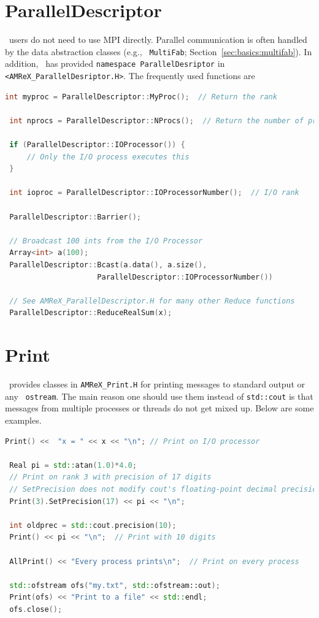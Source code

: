\section{ParallelDescriptor}

\amrex\ users do not need to use MPI directly.  Parallel communication
is often handled by the data abstraction classes (e.g., {\tt
  MultiFab}; Section~\ref{sec:basics:multifab}).  In addition, \amrex\
has provided {\tt namespace ParallelDesriptor} in {\tt
  <AMReX\_ParallelDesriptor.H>}.  The frequently used functions are
\begin{lstlisting}[language=cpp]
 int myproc = ParallelDescriptor::MyProc();  // Return the rank
 
 int nprocs = ParallelDescriptor::NProcs();  // Return the number of processes
 
 if (ParallelDescriptor::IOProcessor()) { 
     // Only the I/O process executes this
 }
 
 int ioproc = ParallelDescriptor::IOProcessorNumber();  // I/O rank
 
 ParallelDescriptor::Barrier();
 
 // Broadcast 100 ints from the I/O Processor
 Array<int> a(100);
 ParallelDescriptor::Bcast(a.data(), a.size(),
                     ParallelDescriptor::IOProcessorNumber())
 
 // See AMReX_ParallelDescriptor.H for many other Reduce functions 
 ParallelDescriptor::ReduceRealSum(x);
\end{lstlisting}

\section{Print}
\label{sec:basics:print}

\amrex\ provides classes in {\tt AMReX\_Print.H} for printing messages
to standard output or any \cpp\ {\tt ostream}.  The main reason one
should use them instead of {\tt std::cout} is that messages from
multiple processes or threads do not get mixed up.  Below are some
examples.
\begin{lstlisting}[language=cpp]
 Print() <<  "x = " << x << "\n"; // Print on I/O processor
 
 Real pi = std::atan(1.0)*4.0;
 // Print on rank 3 with precision of 17 digits
 // SetPrecision does not modify cout's floating-point decimal precision setting.
 Print(3).SetPrecision(17) << pi << "\n";

 int oldprec = std::cout.precision(10);
 Print() << pi << "\n";  // Print with 10 digits
 
 AllPrint() << "Every process prints\n";  // Print on every process
 
 std::ofstream ofs("my.txt", std::ofstream::out);
 Print(ofs) << "Print to a file" << std::endl;
 ofs.close();
\end{lstlisting}


